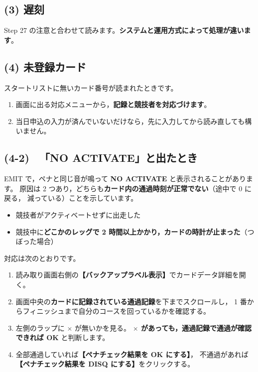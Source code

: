 \subsection*{(3) 遅刻}

Step 27 の注意と合わせて読みます。\textbf{システムと運用方式によって処理が違います}。

\subsection*{(4) 未登録カード}

スタートリストに無いカード番号が読まれたときです。

\begin{enumerate}
\item 画面に出る対応メニューから，\textbf{記録と競技者を対応づけます}。
\item 当日申込の入力が済んでいないだけなら，先に入力してから読み直しても構いません。
\end{enumerate}

\subsection*{(4-2) \tEMIT\ 「NO ACTIVATE」と出たとき}

EMIT で，ペナと同じ音が鳴って \textbf{NO ACTIVATE} と表示されることがあります。
原因は 2 つあり，どちらも\textbf{カード内の通過時刻が正常でない}（途中で 0 に戻る，
減っている）ことを示しています。

\begin{itemize}
\item 競技者がアクティベートせずに出走した
\item 競技中に\textbf{どこかのレッグで 2 時間以上かかり，カードの時計が止まった}（つぼった場合）
\end{itemize}

対応は次のとおりです。

\begin{enumerate}
\item 読み取り画面右側の\textbf{【バックアップラベル表示】}でカードデータ詳細を開く。
\item 画面中央の\textbf{カードに記録されている通過記録}を下までスクロールし，
      1 番からフィニッシュまで自分のコースを回っているかを確認する。
\item 左側のラップに $\times$ が無いかを見る。
      \textbf{$\times$ があっても，通過記録で通過が確認できれば OK} と判断します。
\item 全部通過していれば\textbf{【ペナチェック結果を OK にする】}，
      不通過があれば\textbf{【ペナチェック結果を DISQ にする】}をクリックする。
\end{enumerate}

